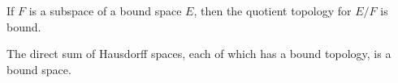 If $F$ is a subspace of a bound space $E$, then the quotient topology for $E/F$ is bound.

The direct sum of Hausdorff spaces, each of which has a bound topology, is a bound space.
